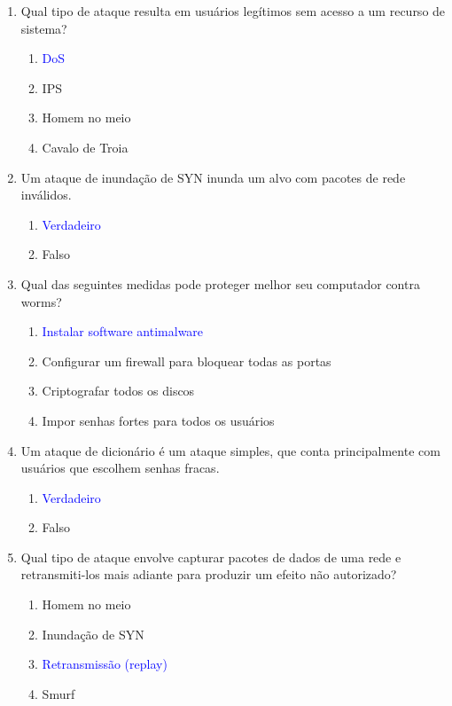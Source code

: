 \documentclass{report}
\begin{document}
\begin{enumerate}
		\item Qual tipo de ataque resulta em usuários legítimos sem acesso a um recurso de sistema?  
		\begin{enumerate}[label=(\alph*)]
			\item \textcolor{blue}{DoS}
			\item IPS
			\item Homem no meio
			\item Cavalo de Troia
		\end{enumerate}
		
		\item Um ataque de inundação de SYN inunda um alvo com pacotes de rede inválidos.  
		\begin{enumerate}[label=(\alph*)]
			\item \textcolor{blue}{Verdadeiro}
			\item Falso
		\end{enumerate}
		
		\item Qual das seguintes medidas pode proteger melhor seu computador contra worms?  
		\begin{enumerate}[label=(\alph*)]
			\item \textcolor{blue}{Instalar software antimalware}
			\item Configurar um firewall para bloquear todas as portas
			\item Criptografar todos os discos
			\item Impor senhas fortes para todos os usuários
		\end{enumerate}
		
		\item Um ataque de dicionário é um ataque simples, que conta principalmente com usuários que escolhem senhas fracas.  
		\begin{enumerate}[label=(\alph*)]
			\item \textcolor{blue}{Verdadeiro}
			\item Falso
		\end{enumerate}
		
		\item Qual tipo de ataque envolve capturar pacotes de dados de uma rede e retransmiti-los mais adiante para produzir um efeito não autorizado?  
		\begin{enumerate}[label=(\alph*)]
			\item Homem no meio
			\item Inundação de SYN
			\item \textcolor{blue}{Retransmissão (replay)}
			\item Smurf
		\end{enumerate}
		

\end{enumerate}
\end{document}
